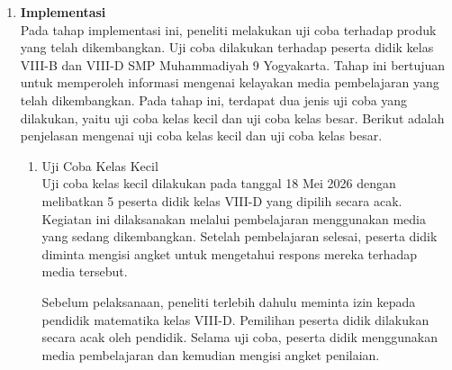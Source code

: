 \begin{enumerate}[leftmargin=1cm, label=\arabic*.]
\begin{enumerate}[label=\arabic*)]
        \textbf{Validasi Ahli Media:}
        
        \hspace*{1cm}Validasi aspek media dilakukan oleh dua ahli media:
        \begin{enumerate}[leftmargin=*, label=--]
            \item Bapak Anggit Prabowo, M.Pd., dosen Pendidikan Matematika Universitas Ahmad Dahlan (UAD).
            \item Bapak Wibowo Ramadhiyanto, S.Pd., pendidik Matematika SMP Muhammadiyah 9 Yogyakarta.
        \end{enumerate}
        
        \hspace*{1cm}Validasi ahli media bertujuan untuk menilai kualitas kegrafikan, kelayakan bahasa, dan kualitas perangkat lunak. Tidak ada revisi yang signifikan dari kedua validator. Hanya saja ada kunci jawaban soal yang salah dan sudah direvisi. Bapak Wibowo menyampaikan bahwa media pembelajaran memiliki visual yang baik, serta terdapat ilustrasi yang dapat mempermudah pemahaman peserta didik.

    \end{enumerate}

    \item \textbf{Implementasi}\\
    \hspace*{1cm}Pada tahap implementasi ini, peneliti melakukan uji coba terhadap produk yang telah dikembangkan. Uji coba dilakukan terhadap peserta didik kelas VIII-B dan VIII-D SMP Muhammadiyah 9 Yogyakarta. Tahap ini bertujuan untuk memperoleh informasi mengenai kelayakan media pembelajaran yang telah dikembangkan. Pada tahap ini, terdapat dua jenis uji coba yang dilakukan, yaitu uji coba kelas kecil dan uji coba kelas besar. Berikut adalah penjelasan mengenai uji coba kelas kecil dan uji coba kelas besar.
    \begin{enumerate}
        \item Uji Coba Kelas Kecil \\
        \hspace*{1cm}Uji coba kelas kecil dilakukan pada tanggal 18 Mei 2026 dengan melibatkan 5 peserta didik kelas VIII-D yang dipilih secara acak. Kegiatan ini dilaksanakan melalui pembelajaran menggunakan media yang sedang dikembangkan. Setelah pembelajaran selesai, peserta didik diminta mengisi angket untuk mengetahui respons mereka terhadap media tersebut.

        \hspace*{1cm}Sebelum pelaksanaan, peneliti terlebih dahulu meminta izin kepada pendidik matematika kelas VIII-D. Pemilihan peserta didik dilakukan secara acak oleh pendidik. Selama uji coba, peserta didik menggunakan media pembelajaran dan kemudian mengisi angket penilaian.


\end{enumerate}
\end{enumerate}

